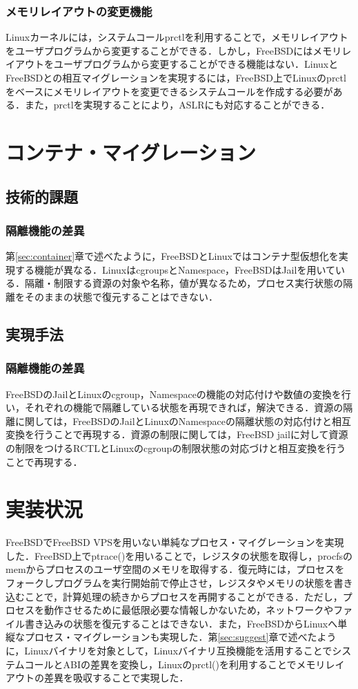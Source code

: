 \documentclass[11pt]{jarticle}
\begin{document}
\subsubsection{メモリレイアウトの変更機能}
Linuxカーネルには，システムコールprctlを利用することで，メモリレイアウトをユーザプログラムから変更することができる．しかし，FreeBSDにはメモリレイアウトをユーザプログラムから変更することができる機能はない．LinuxとFreeBSDとの相互マイグレーションを実現するには，FreeBSD上でLinuxのprctlをベースにメモリレイアウトを変更できるシステムコールを作成する必要がある．また，prctlを実現することにより，ASLRにも対応することができる．

\section{コンテナ・マイグレーション}
\label{sec:CM}
\subsection{技術的課題}
\subsubsection{隔離機能の差異}
第\ref{sec:container}章で述べたように，FreeBSDとLinuxではコンテナ型仮想化を実現する機能が異なる．LinuxはcgroupsとNamespace，FreeBSDはJailを用いている．隔離・制限する資源の対象や名称，値が異なるため，プロセス実行状態の隔離をそのままの状態で復元することはできない．

\subsection{実現手法}
\subsubsection{隔離機能の差異}
FreeBSDのJailとLinuxのcgroup，Namespaceの機能の対応付けや数値の変換を行い，それぞれの機能で隔離している状態を再現できれば，解決できる．資源の隔離に関しては，FreeBSDのJailとLinuxのNamespaceの隔離状態の対応付けと相互変換を行うことで再現する．資源の制限に関しては，FreeBSD jailに対して資源の制限をつけるRCTLとLinuxのcgroupの制限状態の対応づけと相互変換を行うことで再現する．

\section{実装状況}
FreeBSDでFreeBSD VPSを用いない単純なプロセス・マイグレーションを実現した．FreeBSD上でptrace()を用いることで，レジスタの状態を取得し，procfsのmemからプロセスのユーザ空間のメモリを取得する．復元時には，プロセスをフォークしプログラムを実行開始前で停止させ，レジスタやメモリの状態を書き込むことで，計算処理の続きからプロセスを再開することができる．ただし，プロセスを動作させるために最低限必要な情報しかないため，ネットワークやファイル書き込みの状態を復元することはできない．また，FreeBSDからLinuxへ単縦なプロセス・マイグレーションも実現した．第\ref{sec:suggest}章で述べたように，Linuxバイナリを対象として，Linuxバイナリ互換機能を活用することでシステムコールとABIの差異を変換し，Linuxのprctl()を利用することでメモリレイアウトの差異を吸収することで実現した．
\end{document}
